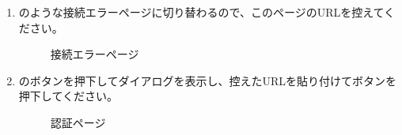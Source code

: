 \begin{enumerate}
            \newpage
            \item {}のような接続エラーページに切り替わるので、このページのURLを控えてください。
                \begin{figure}[htbp]
                    \centering
                    \caption{接続エラーページ}
                    \label{img:spotify14}
                \end{figure}

            \newpage
            \item {}のボタンを押下してダイアログを表示し、控えたURLを貼り付けてボタンを押下してください。
                \begin{figure}[htbp]
                    \centering
                    \caption{認証ページ}
                    \label{img:spotify15}
                \end{figure}


\end{enumerate}
